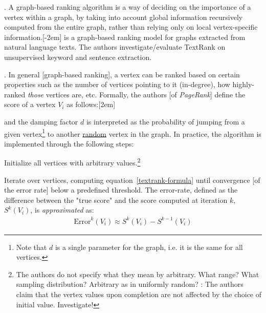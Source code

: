 \documentclass[11pt]{article}
\newcommand\myspace[1][]{\vspace{#1\bigskipamount}}
\newcommand\p{\Needspace{10\baselineskip} \noindent}
\begin{document}
\myspace
\p {}. A graph-based ranking algorithm is a way of deciding on the importance of a vertex within a graph, by taking into account global information recursively computed from the entire graph, rather than relying only on local vertex-specific information.[-2em]  is a graph-based ranking model for graphs extracted from natural language texts. The authors investigate/evaluate TextRank on unsupervised keyword and sentence extraction.

\myspace
\p {}. In general [graph-based ranking], a vertex can be ranked based on certain properties such as the number of vertices pointing to it (in-degree), how highly-ranked \textit{those} vertices are, etc. Formally, the authors [of \textit{PageRank}] define the score of a vertex $V_i$ as follows:[2em]

 \label{textrank-formula}
and the damping factor $d$ is interpreted as the probability of jumping from a given vertex\footnote{Note that $d$ is a single parameter for the graph, i.e. it is the same for all vertices.} to another \underline{random} vertex in the graph. In practice, the algorithm is implemented through the following steps:
\begin{compactitem}
	\item[(1)] Initialize all vertices with arbitrary values.\footnote{The authors do not specify what they mean by arbitrary. What range? What sampling distribution? Arbitrary as in uniformly random? : The authors claim that the vertex values upon completion are not affected by the choice of initial value. Investigate!}
	
	\item[(2)] Iterate over vertices, computing equation~\ref{textrank-formula} until convergence [of the error rate] below a predefined threshold. The error-rate, defined as the difference between the "true score" and the score computed at iteration $k$, $S^k(V_i)$, is \textit{approximated} as:
	\begin{align}
		\textrm{Error}^k(V_i) \approx S^{k}(V_i) - S^{k - 1}(V_i)
	\end{align}
\end{compactitem}
\end{document}
